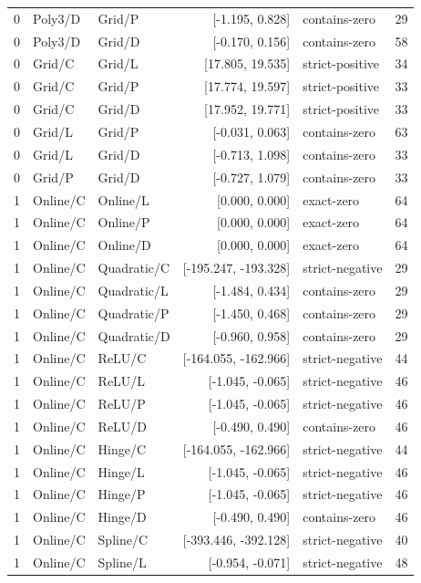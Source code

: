 \begin{longtable}{lllrlr}
0 & Poly3/D & Grid/P & [-1.195, 0.828] & contains-zero & 29 \\
0 & Poly3/D & Grid/D & [-0.170, 0.156] & contains-zero & 58 \\
0 & Grid/C & Grid/L & [17.805, 19.535] & strict-positive & 34 \\
0 & Grid/C & Grid/P & [17.774, 19.597] & strict-positive & 33 \\
0 & Grid/C & Grid/D & [17.952, 19.771] & strict-positive & 33 \\
0 & Grid/L & Grid/P & [-0.031, 0.063] & contains-zero & 63 \\
0 & Grid/L & Grid/D & [-0.713, 1.098] & contains-zero & 33 \\
0 & Grid/P & Grid/D & [-0.727, 1.079] & contains-zero & 33 \\
1 & Online/C & Online/L & [0.000, 0.000] & exact-zero & 64 \\
1 & Online/C & Online/P & [0.000, 0.000] & exact-zero & 64 \\
1 & Online/C & Online/D & [0.000, 0.000] & exact-zero & 64 \\
1 & Online/C & Quadratic/C & [-195.247, -193.328] & strict-negative & 29 \\
1 & Online/C & Quadratic/L & [-1.484, 0.434] & contains-zero & 29 \\
1 & Online/C & Quadratic/P & [-1.450, 0.468] & contains-zero & 29 \\
1 & Online/C & Quadratic/D & [-0.960, 0.958] & contains-zero & 29 \\
1 & Online/C & ReLU/C & [-164.055, -162.966] & strict-negative & 44 \\
1 & Online/C & ReLU/L & [-1.045, -0.065] & strict-negative & 46 \\
1 & Online/C & ReLU/P & [-1.045, -0.065] & strict-negative & 46 \\
1 & Online/C & ReLU/D & [-0.490, 0.490] & contains-zero & 46 \\
1 & Online/C & Hinge/C & [-164.055, -162.966] & strict-negative & 44 \\
1 & Online/C & Hinge/L & [-1.045, -0.065] & strict-negative & 46 \\
1 & Online/C & Hinge/P & [-1.045, -0.065] & strict-negative & 46 \\
1 & Online/C & Hinge/D & [-0.490, 0.490] & contains-zero & 46 \\
1 & Online/C & Spline/C & [-393.446, -392.128] & strict-negative & 40 \\
1 & Online/C & Spline/L & [-0.954, -0.071] & strict-negative & 48 \\

\end{longtable}
